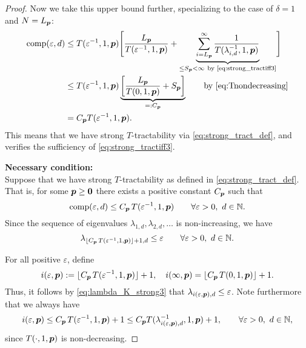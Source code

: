 \documentclass[sort&compress]{elsarticle}
\newcommand{\thed}{\delta}
\begin{document}
\begin{proof}
Now we take this upper bound further, specializing to the case of $\thed=1$ and $N=L_{\boldsymbol{p}}$:
\begin{align*}
       \operatorname{comp}(\varepsilon,d)
       & \le T(\varepsilon^{-1},1, \boldsymbol{p}) \Biggl [ \frac{L_{\boldsymbol{p}}}{T(\varepsilon^{-1},1, \boldsymbol{p})}  + \underbrace{\sum_{i=L_{\boldsymbol{p}}}^\infty \frac{1}{T(\lambda_{i, d}^{-1},1,\boldsymbol{p})}}_{\le S_{\boldsymbol{p}} <\infty\ \text{by \eqref{eq:strong_tractiff3}} }
        \Biggr] \\
       & \le T(\varepsilon^{-1},1,\boldsymbol{p}) \underbrace{\left[\frac{L_{\boldsymbol{p}}}{T(0,1, \boldsymbol{p})} + S_{\boldsymbol{p}} \right]}_{=:C_{\boldsymbol{p}}}
       \qquad \text{by \eqref{eq:Tnondecreasing}}\\
       & =  C_{\boldsymbol{p}}T(\varepsilon^{-1},1,\boldsymbol{p}).
\end{align*}
This means that we have strong $T$-tractability via \eqref{eq:strong_tract_def}, and verifies the sufficiency of \eqref{eq:strong_tractiff3}.



\bigskip
\noindent \textbf{Necessary condition:} \\
Suppose that we have strong
$T$-tractability as defined in \eqref{eq:strong_tract_def}. That is, for some $\boldsymbol{p} \ge \boldsymbol{0}$ there exists a positive constant $C_{\boldsymbol{p}}$ such that
\[
\operatorname{comp}(\varepsilon,d)\le C_{\boldsymbol{p}}\, T(\varepsilon^{-1},1,\boldsymbol{p})
\qquad \forall \varepsilon > 0, \ d \in \mathbb{N}.
\]
Since the sequence of eigenvalues $\lambda_{1,d}, \lambda_{2,d}, \ldots $ is non-increasing, we have
\begin{equation}\label{eq:lambda_K_strong3}
\lambda_{\lfloor C_{\boldsymbol{p}}\, T(\varepsilon^{-1},1,\boldsymbol{p})\rfloor +1,d}\le \varepsilon \qquad \forall \varepsilon > 0, \ d \in \mathbb{N}.
\end{equation}

For all positive $\varepsilon$, define
\begin{equation}\label{eq:iepsp}
i(\varepsilon,\boldsymbol{p}):= \lfloor C_{\boldsymbol{p}}\, T(\varepsilon^{-1},1,\boldsymbol{p})\rfloor +1, \quad
i(\infty,\boldsymbol{p}) =\lfloor C_{\boldsymbol{p}}\, T(0,1,\boldsymbol{p})\rfloor +1.
\end{equation}
Thus, it follows by \eqref{eq:lambda_K_strong3} that $\lambda_{i(\varepsilon,\boldsymbol{p}),d} \le \varepsilon$.
Note furthermore that we always have
\[
i(\varepsilon,\boldsymbol{p})\le C_{\boldsymbol{p}}\, T(\varepsilon^{-1},1,\boldsymbol{p})+1 \le C_{\boldsymbol{p}} T(\lambda_{i(\varepsilon,\boldsymbol{p}),d}^{-1},1,\boldsymbol{p})+1, \qquad \forall \varepsilon > 0, \ d \in \mathbb{N},
\]
since
$T(\cdot,1, \boldsymbol{p})$ is non-decreasing.


\end{proof}
\end{document}
